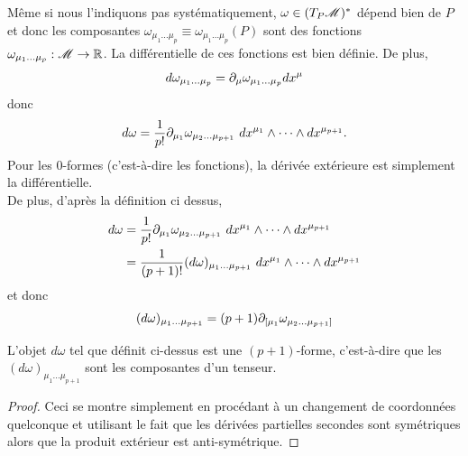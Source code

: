 \documentclass[a4paper,11pt]{report}
\begin{document}
            Même si nous l'indiquons pas systématiquement, $\omega\in (T_P\mathscr{M})^*$ dépend bien de $P$ et donc les composantes $\omega_{\mu_1\dots\mu_p}\equiv \omega_{\mu_1\dots\mu_p}(P)$ sont des fonctions $\omega_{\mu_1\dots\mu_p}:\mathscr{M}\to\mathbb{R}$. La différentielle de ces fonctions est bien définie. De plus, 
            \begin{equation}
                d\omega_{\mu_1\dots\mu_p} = \partial_\mu \omega_{\mu_1\dots\mu_p}dx^\mu
            \end{equation}
            donc
            \begin{equation}
                d\omega = \frac{1}{p!} \partial_{\mu_1}\omega_{\mu_2\dots\mu_{p+1}}~dx^{\mu_1}\wedge \dots\wedge dx^{\mu_{p+1}}.
            \end{equation}
            Pour les $0$-formes (c'est-à-dire les fonctions), la dérivée extérieure est simplement la différentielle.\\
            
            De plus, d'après la définition ci dessus,
            \begin{align}
                d\omega &= \frac{1}{p!} \partial_{\mu_1}\omega_{\mu_2\dots\mu_{p+1}}~dx^{\mu_1}\wedge \dots\wedge dx^{\mu_{p+1}}\\
                &= \frac{1}{(p+1)!}(d\omega)_{\mu_1 \dots\mu_{p+1}}~dx^{\mu_1}\wedge \dots\wedge dx^{\mu_{p+1}}
            \end{align}
            et donc
            \begin{equation}
                (d\omega)_{\mu_1 \dots\mu_{p+1}} = (p+1) \partial_{[\mu_1}\omega_{\mu_2\dots\mu_{p+1}]}
            \end{equation}
            
            \begin{thm}\begin{leftbar}
                L'objet $d\omega$ tel que définit ci-dessus est une $(p+1)$-forme, c'est-à-dire que les $(d\omega)_{\mu_1 \dots\mu_{p+1}}$ sont les composantes d'un tenseur.
            \end{leftbar}\end{thm}
            
            \begin{proof}
                Ceci se montre simplement en procédant à un changement de coordonnées quelconque et utilisant le fait que les dérivées partielles secondes sont symétriques alors que la produit extérieur est anti-symétrique.
            \end{proof}
            
\end{document}
